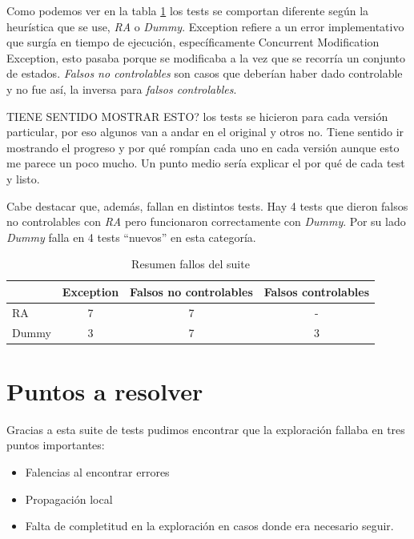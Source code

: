 Como podemos ver en la tabla \ref{tab:resultadosTest} los tests se comportan diferente según la heurística que se use, \textit{RA} o \textit{Dummy}. Exception refiere a un error implementativo que surgía en tiempo de ejecución, específicamente Concurrent Modification Exception, esto pasaba porque se modificaba a la vez que se recorría un conjunto de estados. \textit{Falsos  no controlables} son casos que deberían haber dado controlable y no fue así, la inversa para \textit{falsos controlables}.


TIENE SENTIDO MOSTRAR ESTO? los tests se hicieron para cada versión particular, por eso algunos van a andar en el original y otros no. Tiene sentido ir mostrando el progreso y por qué rompían cada uno en cada versión aunque esto me parece un poco mucho. Un punto medio sería explicar el por qué de cada test y listo.

Cabe destacar que, además, fallan en distintos tests. Hay 4 tests que dieron falsos no controlables con \textit{RA} pero funcionaron correctamente con \textit{Dummy}. Por su lado \textit{Dummy} falla en 4 tests ``nuevos'' en esta categoría.

\begin{table}
    \centering
    \begin{tabular}{|l|c|c|c|}
    \hline
         & Exception & Falsos no controlables & Falsos controlables \\ \hline
        RA & 7 & 7 & - \\ \hline
        Dummy & 3 & 7 & 3 \\ 
    \hline
    \end{tabular}
    \caption{Resumen fallos del suite}
    \label{tab:resultadosTest}
\end{table}

\section{Puntos a resolver}
Gracias a esta suite de tests pudimos encontrar que la exploración fallaba en tres puntos importantes:
\begin{itemize}
 \item Falencias al encontrar errores
 \item Propagación local
 \item Falta de completitud en la exploración en casos donde era necesario seguir.
\end{itemize}

